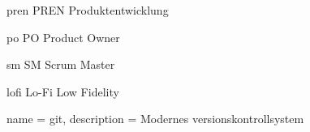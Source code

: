 \newacronym
  {pren}                %
  {PREN}                %
  {Produktentwicklung}  %
  
\newacronym
  {po}
  {PO}
  {Product Owner}
  
\newacronym
  {sm}
  {SM}
  {Scrum Master}

\newacronym
  {lofi}
  {Lo-Fi}
  {Low Fidelity}
  

{
  name = git,
  description = {
    Modernes versionskontrollsystem
  }
}